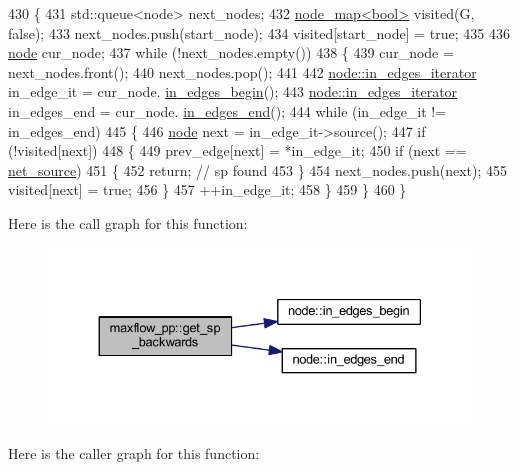\begin{DoxyCode}
430 \{
431     std::queue<node> next\_nodes;
432     \mbox{\hyperlink{classnode__map}{node\_map<bool>}} visited(G, \textcolor{keyword}{false});
433     next\_nodes.push(start\_node);
434     visited[start\_node] = \textcolor{keyword}{true};
435 
436     \mbox{\hyperlink{classnode}{node}} cur\_node;
437     \textcolor{keywordflow}{while} (!next\_nodes.empty())
438     \{
439     cur\_node = next\_nodes.front();
440     next\_nodes.pop();
441         
442     \mbox{\hyperlink{classnode_a9a96be92add7c1a2771bcd0431ebf8ab}{node::in\_edges\_iterator}} in\_edge\_it = cur\_node.
      \mbox{\hyperlink{classnode_a0c32377f370ae52ed2134ff8d4dac584}{in\_edges\_begin}}();
443     \mbox{\hyperlink{classnode_a9a96be92add7c1a2771bcd0431ebf8ab}{node::in\_edges\_iterator}} in\_edges\_end = cur\_node.
      \mbox{\hyperlink{classnode_a785cd330f8b4c5c47d3b6e936a7e744e}{in\_edges\_end}}();
444     \textcolor{keywordflow}{while} (in\_edge\_it != in\_edges\_end)
445     \{
446         \mbox{\hyperlink{classnode}{node}} next = in\_edge\_it->source();
447         \textcolor{keywordflow}{if} (!visited[next])
448         \{
449         prev\_edge[next] = *in\_edge\_it;
450         \textcolor{keywordflow}{if} (next == \mbox{\hyperlink{classmaxflow__pp_a20f2d05465acc2d7b777ea8025d12003}{net\_source}}) 
451         \{
452             \textcolor{keywordflow}{return}; \textcolor{comment}{// sp found}
453         \}
454         next\_nodes.push(next);
455         visited[next] = \textcolor{keyword}{true};
456         \}
457         ++in\_edge\_it;
458     \}
459     \}
460 \}
\end{DoxyCode}
Here is the call graph for this function\+:\nopagebreak
\begin{figure}[H]
\begin{center}
\leavevmode
\includegraphics[width=330pt]{classmaxflow__pp_a58b7af1b215766e99adcca0994ecfb7a_cgraph}
\end{center}
\end{figure}
Here is the caller graph for this function\+:\nopagebreak
